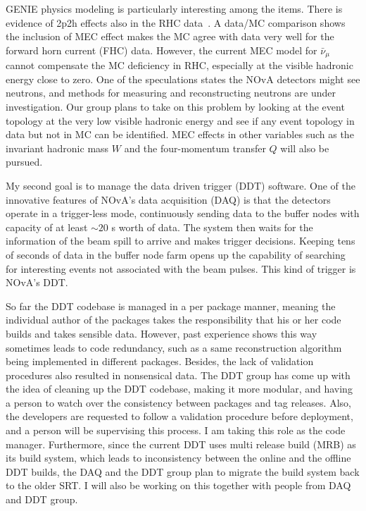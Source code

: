 \documentclass[a4paper, 11pt]{article} %
\begin{document}
GENIE physics modeling is particularly interesting among the items. There is evidence of 2p2h effects also in the RHC data~\cite{Bashar:2016_1}. A data/MC comparison shows the inclusion of MEC effect makes the MC agree with data very well for the forward horn current (FHC) data. However, the current MEC model for $\bar{\nu}_\mu$ cannot compensate the MC deficiency in RHC, especially at the visible hadronic energy close to zero. One of the speculations states the NOvA detectors might see neutrons, and methods for measuring and reconstructing neutrons are under investigation. Our group plans to take on this problem by looking at the event topology at the very low visible hadronic energy and see if any event topology in data but not in MC can be identified. MEC effects in other variables such as the invariant hadronic mass $W$ and the four-momentum transfer $Q$ will also be pursued.\newline

My second goal is to manage the data driven trigger (DDT) software. One of the innovative features of NOvA's data acquisition (DAQ) is that the detectors operate in a trigger-less mode, continuously sending data to the buffer nodes with capacity of at least $\sim 20$ s worth of data. The system then waits for the information of the beam spill to arrive and makes trigger decisions. Keeping tens of seconds of data in the buffer node farm opens up the capability of searching for interesting events not associated with the beam pulses. This kind of trigger is NOvA's DDT.

So far the DDT codebase is managed in a per package manner, meaning the individual author of the packages takes the responsibility that his or her code builds and takes sensible data. However, past experience shows this way sometimes leads to code redundancy, such as a same reconstruction algorithm being implemented in different packages. Besides, the lack of validation procedures also resulted in nonsensical data. The DDT group has come up with the idea of cleaning up the DDT codebase, making it more modular, and having a person to watch over the consistency between packages and tag releases. Also, the developers are requested to follow a validation procedure before deployment, and a person will be supervising this process. I am taking this role as the code manager. Furthermore, since the current DDT uses multi release build (MRB) as its build system, which leads to inconsistency between the online and the offline DDT builds, the DAQ and the DDT group plan to migrate the build system back to the older SRT. I will also be working on this together with people from DAQ and DDT group.\newline
\end{document}
